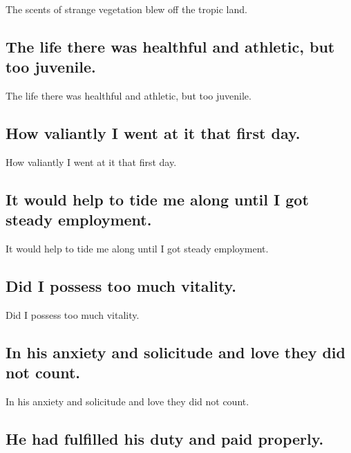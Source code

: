 \documentclass[]{article}
\begin{document}
The scents of strange vegetation blew off the tropic land.

\hypertarget{the-life-there-was-healthful-and-athletic-but-too-juvenile.}{%
\subsection{The life there was healthful and athletic, but too
juvenile.}\label{the-life-there-was-healthful-and-athletic-but-too-juvenile.}}

The life there was healthful and athletic, but too juvenile.

\hypertarget{how-valiantly-i-went-at-it-that-first-day.}{%
\subsection{How valiantly I went at it that first
day.}\label{how-valiantly-i-went-at-it-that-first-day.}}

How valiantly I went at it that first day.

\hypertarget{it-would-help-to-tide-me-along-until-i-got-steady-employment.}{%
\subsection{It would help to tide me along until I got steady
employment.}\label{it-would-help-to-tide-me-along-until-i-got-steady-employment.}}

It would help to tide me along until I got steady employment.

\hypertarget{did-i-possess-too-much-vitality.}{%
\subsection{Did I possess too much
vitality.}\label{did-i-possess-too-much-vitality.}}

Did I possess too much vitality.

\hypertarget{in-his-anxiety-and-solicitude-and-love-they-did-not-count.}{%
\subsection{In his anxiety and solicitude and love they did not
count.}\label{in-his-anxiety-and-solicitude-and-love-they-did-not-count.}}

In his anxiety and solicitude and love they did not count.

\hypertarget{he-had-fulfilled-his-duty-and-paid-properly.}{%
\subsection{He had fulfilled his duty and paid
properly.}\label{he-had-fulfilled-his-duty-and-paid-properly.}}
\end{document}
